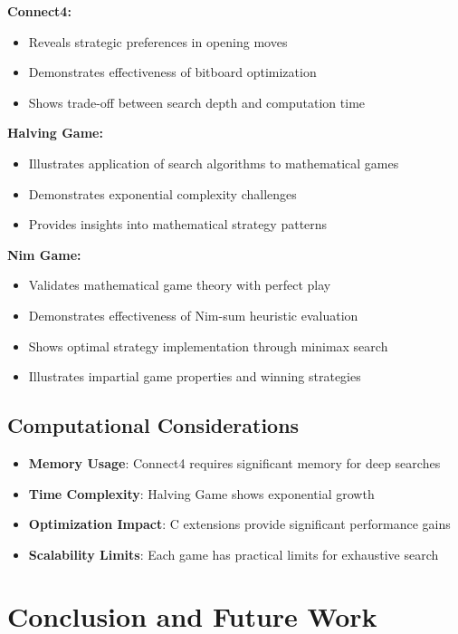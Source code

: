 \documentclass[12pt]{article}
\begin{document}
\textbf{Connect4:}
\begin{itemize}
    \item Reveals strategic preferences in opening moves
    \item Demonstrates effectiveness of bitboard optimization
    \item Shows trade-off between search depth and computation time
\end{itemize}

\textbf{Halving Game:}
\begin{itemize}
    \item Illustrates application of search algorithms to mathematical games
    \item Demonstrates exponential complexity challenges
    \item Provides insights into mathematical strategy patterns
\end{itemize}

\textbf{Nim Game:}
\begin{itemize}
    \item Validates mathematical game theory with perfect play
    \item Demonstrates effectiveness of Nim-sum heuristic evaluation
    \item Shows optimal strategy implementation through minimax search
    \item Illustrates impartial game properties and winning strategies
\end{itemize}

\subsection{Computational Considerations}

\begin{itemize}
    \item \textbf{Memory Usage}: Connect4 requires significant memory for deep searches
    \item \textbf{Time Complexity}: Halving Game shows exponential growth
    \item \textbf{Optimization Impact}: C extensions provide significant performance gains
    \item \textbf{Scalability Limits}: Each game has practical limits for exhaustive search
\end{itemize}

\section{Conclusion and Future Work}
\end{document}

